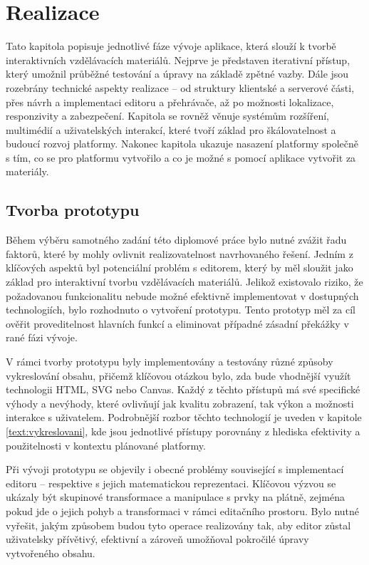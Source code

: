 \chapter{Realizace}

\begin{chapterabstract}
Tato kapitola popisuje jednotlivé fáze vývoje aplikace, která slouží k tvorbě interaktivních vzdělávacích materiálů. 
Nejprve je představen iterativní přístup, který umožnil průběžné testování a úpravy na základě zpětné vazby. 
Dále jsou rozebrány technické aspekty realizace -- od struktury klientské a serverové části, přes návrh a implementaci editoru a přehrávače, až po možnosti lokalizace, responzivity a zabezpečení. 
Kapitola se rovněž věnuje systémům rozšíření, multimédií a uživatelských interakcí, které tvoří základ pro škálovatelnost a budoucí rozvoj platformy. 
Nakonec kapitola ukazuje nasazení platformy společně s tím, co se pro platformu vytvořilo a co je možné s pomocí aplikace vytvořit za materiály.
\end{chapterabstract}

\section{Tvorba prototypu}


Během výběru samotného zadání této diplomové práce bylo nutné zvážit řadu faktorů, které by mohly ovlivnit realizovatelnost navrhovaného řešení. 
Jedním z klíčových aspektů byl potenciální problém s editorem, který by měl sloužit jako základ pro interaktivní tvorbu vzdělávacích materiálů. 
Jelikož existovalo riziko, že požadovanou funkcionalitu nebude možné efektivně implementovat v dostupných technologiích, bylo rozhodnuto o vytvoření prototypu. 
Tento prototyp měl za cíl ověřit proveditelnost hlavních funkcí a eliminovat případné zásadní překážky v rané fázi vývoje.

V rámci tvorby prototypu byly implementovány a testovány různé způsoby vykreslování obsahu, přičemž klíčovou otázkou bylo, zda bude vhodnější využít technologii HTML, SVG nebo Canvas.
Každý z těchto přístupů má své specifické výhody a nevýhody, které ovlivňují jak kvalitu zobrazení, tak výkon a možnosti interakce s uživatelem. 
Podrobnější rozbor těchto technologií je uveden v kapitole \ref{text:vykreslovani}, kde jsou jednotlivé přístupy porovnány z hlediska efektivity a použitelnosti v kontextu plánované platformy.

Při vývoji prototypu se objevily i obecné problémy související s implementací editoru -- respektive s jejich matematickou reprezentaci. 
Klíčovou výzvou se ukázaly být skupinové transformace a manipulace s prvky na plátně, zejména pokud jde o jejich pohyb a transformaci v rámci editačního prostoru.
Bylo nutné vyřešit, jakým způsobem budou tyto operace realizovány tak, aby editor zůstal uživatelsky přívětivý, efektivní a zároveň umožňoval pokročilé úpravy vytvořeného obsahu.

